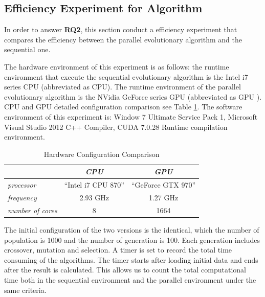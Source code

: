 \subsection{Efficiency Experiment for Algorithm}
%
In order to answer \textbf{RQ2}, this section conduct a efficiency experiment
that compares the efficiency between the parallel evolutionary algorithm and the
sequential one.

The hardware environment of this experiment is as follows: the runtime
environment that execute the sequential evolutionary algorithm is the Intel i7
series CPU (abbreviated as CPU). The runtime environment of the parallel
evolutionary algorithm is the NVidia GeForce series GPU (abbreviated as GPU
). CPU and GPU detailed configuration comparison see Table \ref{tab:cpugpu}. The
software environment of this experiment is: Window 7 Ultimate Service Pack 1,
Microsoft Visual Studio 2012 C++ Compiler, CUDA 7.0.28 Runtime compilation
environment.

\begin{table}[!ht]
  \centering
  \caption{Hardware Configuration Comparison}
  \label{tab:cpugpu}
  \begin{tabular}{lcc}
    \hline
        & \emph{ CPU } & \emph{ GPU } \\
    \hline
    \emph{ processor } & ``Intel i7 CPU 870'' & ``GeForce GTX 970'' \\
    \emph{ frequency } & 2.93 GHz & 1.27 GHz \\
    \emph{ number of cores } & 8 & 1664 \\
    \hline
  \end{tabular}
\end{table}

The initial configuration of the two versions is the identical, which the number
of population is 1000 and the number of generation is 100. Each generation
includes crossover, mutation and selection. A timer is set to record the total
time consuming of the algorithms. The timer starts after loading initial data
and ends after the result is calculated. This allows us to count the total
computational time both in the sequential environment and the parallel
environment under the same criteria.


